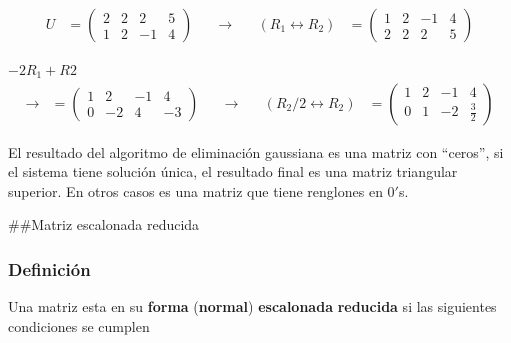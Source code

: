 \documentclass[
]{article}
\begin{document}
\begin{equation*}
 \begin{array}{ccccc}
   U & = \begin{pmatrix}
                                  2   &   2 &   2  & 5   \\
                                  1   &   2 &   -1 & 4    
                                \end{pmatrix} & \quad\rightarrow \quad
    & (R_1 \leftrightarrow R_2)  
        &= \begin{pmatrix}
                                  1   &   2 &   -1  & 4   \\
                                  2   &   2 &    2  & 5   
                                \end{pmatrix}
 \end{array}
\end{equation*}

\(-2R_1 + R2\) \begin{equation*}
 \begin{array}{ccccc}
   \rightarrow & = \begin{pmatrix}
                           1   &   2 &   -1  & 4   \\
                           0   &   -2 &   4  & -3    
                                \end{pmatrix} & \quad\rightarrow \quad
    & (R_2/2 \leftrightarrow R_2)  
        &= \begin{pmatrix}
                                  1   &   2 &   -1  & 4   \\
                                  0   &   1 &    -2  & \frac{3}{2}   
                                \end{pmatrix}
 \end{array}
\end{equation*}

El resultado del algoritmo de eliminación gaussiana es una matriz con
``ceros'', si el sistema tiene solución única, el resultado final es una
matriz triangular superior. En otros casos es una matriz que tiene
renglones en \(0'\)s.

\#\#Matriz escalonada reducida

\hypertarget{definiciuxf3n-5}{%
\subsubsection{Definición}\label{definiciuxf3n-5}}

Una matriz esta en su \textbf{forma} (\textbf{normal})
\textbf{escalonada} \textbf{reducida} si las siguientes condiciones se
cumplen
\end{document}
